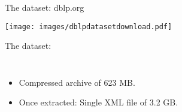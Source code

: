 \documentclass[aspectratio = 169, 15pt, handout]{beamer}
\begin{document}
    \begin{frame}{The dataset: dblp.org}
        \begin{center}
            \vspace*{-0.1cm}
            \texttt{[image: images/dblpdatasetdownload.pdf]}
        \end{center}
        
        \vspace*{-0.3cm}
        {\color{darkgray}The dataset:}
        \begin{columns}[t]
                \vspace*{-0.6cm}
                \begin{itemize}
                	\item Compressed archive of 623 MB.
                	\item Once extracted: Single XML file of 3.2 GB.
                \end{itemize}
                

\end{columns}
\end{frame}
\end{document}
